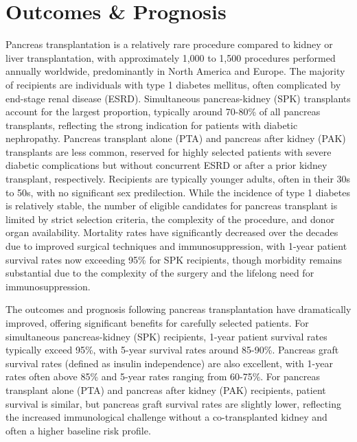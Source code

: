 \section*{Outcomes \& Prognosis}
Pancreas transplantation is a relatively rare procedure compared to kidney or liver transplantation, with approximately 1,000 to 1,500 procedures performed annually worldwide, predominantly in North America and Europe. The majority of recipients are individuals with type 1 diabetes mellitus, often complicated by end-stage renal disease (ESRD). Simultaneous pancreas-kidney (SPK) transplants account for the largest proportion, typically around 70-80\% of all pancreas transplants, reflecting the strong indication for patients with diabetic nephropathy. Pancreas transplant alone (PTA) and pancreas after kidney (PAK) transplants are less common, reserved for highly selected patients with severe diabetic complications but without concurrent ESRD or after a prior kidney transplant, respectively. Recipients are typically younger adults, often in their 30s to 50s, with no significant sex predilection. While the incidence of type 1 diabetes is relatively stable, the number of eligible candidates for pancreas transplant is limited by strict selection criteria, the complexity of the procedure, and donor organ availability. Mortality rates have significantly decreased over the decades due to improved surgical techniques and immunosuppression, with 1-year patient survival rates now exceeding 95\% for SPK recipients, though morbidity remains substantial due to the complexity of the surgery and the lifelong need for immunosuppression.

The outcomes and prognosis following pancreas transplantation have dramatically improved, offering significant benefits for carefully selected patients. For simultaneous pancreas-kidney (SPK) recipients, 1-year patient survival rates typically exceed 95\%, with 5-year survival rates around 85-90\%. Pancreas graft survival rates (defined as insulin independence) are also excellent, with 1-year rates often above 85\% and 5-year rates ranging from 60-75\%. For pancreas transplant alone (PTA) and pancreas after kidney (PAK) recipients, patient survival is similar, but pancreas graft survival rates are slightly lower, reflecting the increased immunological challenge without a co-transplanted kidney and often a higher baseline risk profile.

